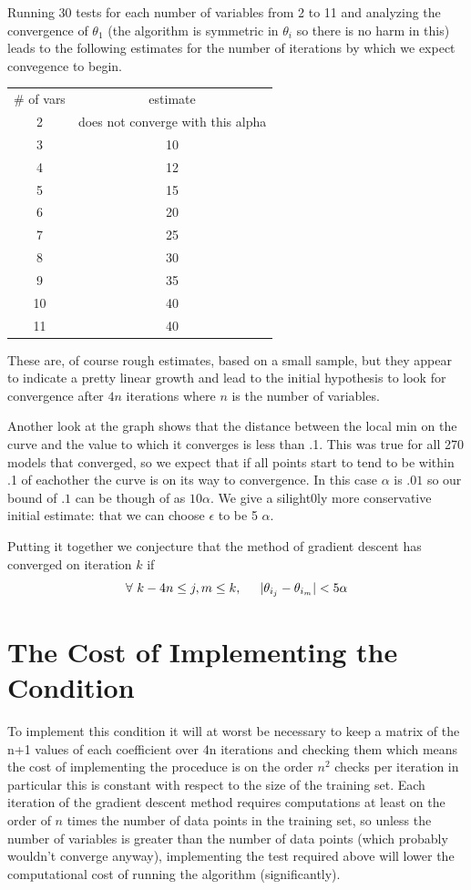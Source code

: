 \documentclass[11pt]{article} %
\begin{document}
Running 30 tests for each number of variables from 2 to 11 and analyzing the convergence of $\theta_{1}$ (the algorithm is symmetric in $\theta_{i}$ so there is no harm in this) leads to the following estimates for the number of iterations by which we expect convegence to begin. 

\begin{tabular} {cc}
\# of vars & estimate \\
2 & does not converge with this alpha\\
3 &  10 \\
4 &  12 \\
5 &  15 \\
6 &  20 \\
7 &  25 \\
8 & 30 \\
9 & 35 \\
10 & 40\\
11 & 40

\end{tabular} 

These are, of course rough estimates, based on a small sample, but they appear to indicate a pretty linear growth and lead to the initial hypothesis to look for convergence after $4n$ iterations where $n$ is the number of variables. 

Another look at the graph shows that the distance between the local min on the curve and the value to which it converges is less than .1.  This was true for all 270 models that converged,
so we expect that if all points start to tend to be within .1 of eachother the curve is on its way to convergence.  In this case $\alpha$ is $.01$ so our bound of $.1$ can be though of as 
$10\alpha$.  We give a silight0ly more conservative initial estimate: that we can choose $\epsilon$ to be 5 $\alpha$. 

Putting it together we conjecture that the method of gradient descent has converged on iteration $k$ if 
$$\forall\ k - 4n \leq  j,m \leq k, \hspace{.2in} 
|\theta_{i_{j}} - \theta_{i_{m}}| < 5\alpha$$  

\section{The Cost of Implementing the Condition}
To implement this condition it will at worst be necessary to keep a matrix of the n+1 values of each coefficient over 4n iterations and checking them which means the cost of 
implementing the proceduce is on the order $n^2$ checks per iteration in particular this is constant with respect to the size of the training set. Each iteration of the gradient descent method requires computations at least on the order of $n$ times the number of data points in the training set, so unless the number of variables is greater than the number of data points (which probably wouldn't converge anyway), implementing the test required above will lower the computational cost of running the algorithm (significantly). 
\end{document}
